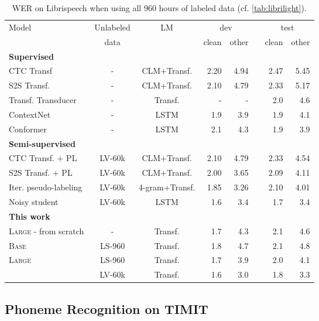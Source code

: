 \documentclass{article}
\newcommand{\wvppbase}{\textsc{Base}}
\newcommand{\wvppbig}{\textsc{Large}}
\newcommand{\libri}{Librispeech}
\newcommand{\voxsz}{LV-60k}
\newcommand{\librisz}{LS-960}
\begin{document}
\begin{table}
\caption{WER on \libri{} when using all 960 hours of labeled data (cf. \autoref{tab:librilight}).
}
\label{tab:librispeech}
\centering 
\begin{tabular}{lccrrrrr}
\toprule
\multirow{2}{*}{Model} & Unlabeled & \multirow{2}{*}{LM} & \multicolumn{2}{c}{dev} && \multicolumn{2}{c}{test} \\
\cline{4-5}\cline{7-8} 
{} & data & {} & clean & other && clean & other \\
\midrule
\textbf{Supervised} \\
CTC Transf~\citep{synnaeve2020end} & - & CLM+Transf. & 2.20 & 4.94 && 2.47 & 5.45 \\
S2S Transf. ~\citep{synnaeve2020end} & - & CLM+Transf. & 2.10 & 4.79 && 2.33 & 5.17 \\
Transf. Transducer~\citep{zhang2020transformer} & - & Transf. & - & - && 2.0 & 4.6 \\
ContextNet~\citep{han2020contextnet} & - & LSTM & 1.9 & 3.9 && 1.9 & 4.1 \\
Conformer~\citep{gulati2020conformer} & - & LSTM & 2.1 & 4.3 && 1.9 & 3.9 \\
\midrule
\textbf{Semi-supervised} \\
CTC Transf. + PL~\citep{synnaeve2020end} & \voxsz{} & CLM+Transf. &  2.10 & 4.79 && 2.33 & 4.54 \\
S2S Transf. + PL~\citep{synnaeve2020end} & \voxsz{} & CLM+Transf. &  2.00 & 3.65 && 2.09 & 4.11 \\
Iter. pseudo-labeling~\cite{xu2020iterative} & \voxsz{} & 4-gram+Transf. & 1.85 & 3.26 && 2.10 & 4.01 \\
Noisy student~\citep{park2020improved} & \voxsz{} & LSTM & 1.6 & 3.4 && 1.7 & 3.4 \\
\midrule
\textbf{This work} \\
\wvppbig{} - from scratch & - & Transf. & 1.7 & 4.3 && 2.1 & 4.6 \\
\wvppbase{} & \librisz{} & Transf. & 1.8 & 4.7 && 2.1 & 4.8 \\
\wvppbig{} & \librisz{} & Transf. & 1.7 & 3.9 && 2.0 & 4.1 \\
& \voxsz{} & Transf. & 1.6 & 3.0 && 1.8 & 3.3 \\
\bottomrule
\end{tabular}
\end{table}

\subsection{Phoneme Recognition on TIMIT}
\end{document}
